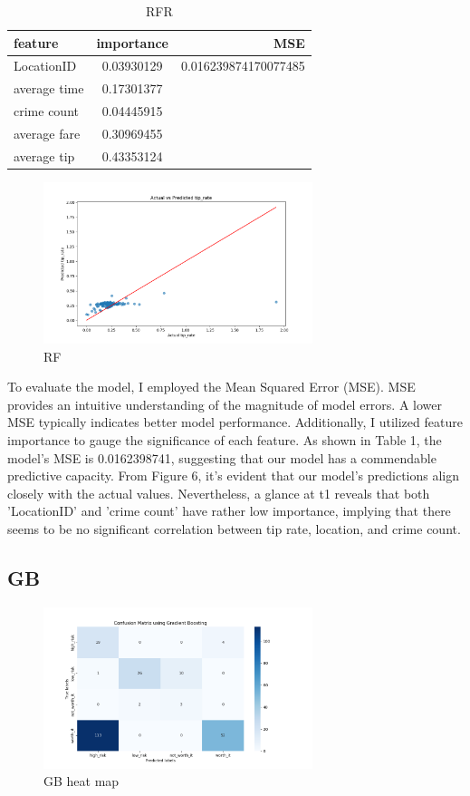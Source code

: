 \documentclass[11pt]{article}
\begin{document}
\begin{table}[h]
\centering
\caption{RFR}
\label{table:example}
\begin{tabular}{|l|c|r|}
\hline
feature & importance & MSE \\
\hline
LocationID & 0.03930129 & 0.016239874170077485 \\
average time & 0.17301377 &  \\
crime count & 0.04445915 &  \\
average fare & 0.30969455 &  \\
average tip & 0.43353124 &  \\
\hline
\end{tabular}
\end{table}

\begin{figure}[h]
    \includegraphics[width=0.7\textwidth]{plots/RF result.png}
    \centering
    \caption{RF} 
\end{figure}
To evaluate the model, I employed the Mean Squared Error (MSE). MSE provides an intuitive understanding of the magnitude of model errors. A lower MSE typically indicates better model performance. Additionally, I utilized feature importance to gauge the significance of each feature. As shown in Table 1, the model's MSE is 0.0162398741, suggesting that our model has a commendable predictive capacity. From Figure 6, it's evident that our model's predictions align closely with the actual values. Nevertheless, a glance at t1 reveals that both 'LocationID' and 'crime count' have rather low importance, implying that there seems to be no significant correlation between tip rate, location, and crime count.


\subsection{GB}

\begin{figure}[h]
    \includegraphics[width=0.7\textwidth]{plots/GB heat map.png}
    \centering
    \caption{GB heat map} 
\end{figure}
\end{document}
